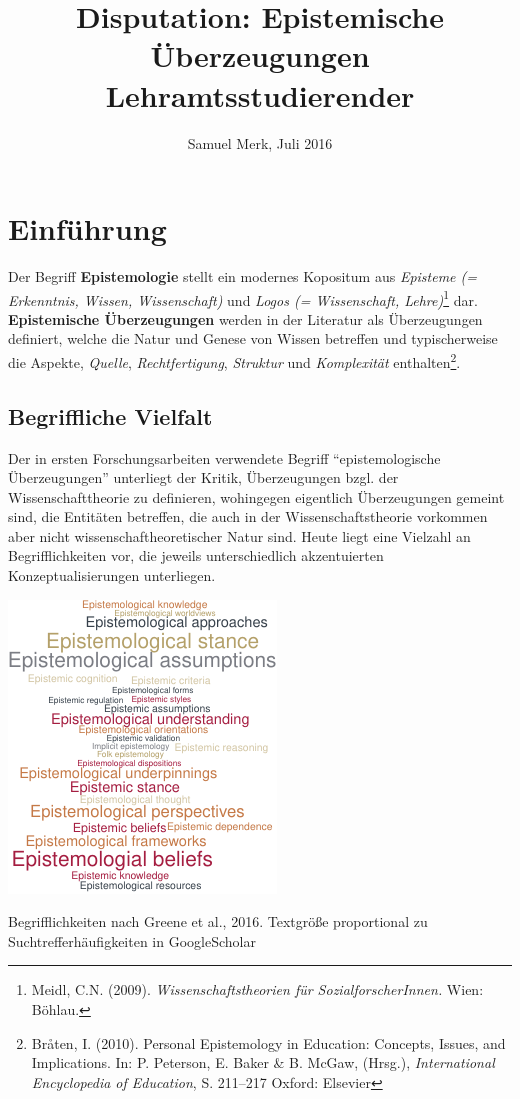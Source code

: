 \documentclass[]{tufte-handout}
\title{Disputation: Epistemische Überzeugungen \mbox{Lehramtsstudierender}}
\date{Samuel Merk, Juli 2016}
\begin{document}
\maketitle




\section{Einführung}\label{einfuhrung}

Der Begriff \textbf{Epistemologie} stellt ein modernes Kopositum aus
\emph{Episteme (= Erkenntnis, Wissen, Wissenschaft)} und \emph{Logos (=
Wissenschaft, Lehre)}\footnote{Meidl, C.N. (2009).
  \emph{Wissenschaftstheorien für SozialforscherInnen.} Wien: Böhlau.}
dar. \textbf{Epistemische Überzeugungen} werden in der Literatur als
Überzeugungen definiert, welche die Natur und Genese von Wissen
betreffen und typischerweise die Aspekte, \emph{Quelle},
\emph{Rechtfertigung}, \emph{Struktur} und \emph{Komplexität}
enthalten\footnote{Bråten, I. (2010). Personal Epistemology in
  Education: Concepts, Issues, and Implications. In: P. Peterson, E.
  Baker \& B. McGaw, (Hrsg.), \emph{International Encyclopedia of
  Education}, S. 211--217 Oxford: Elsevier}.

\subsection{Begriffliche Vielfalt}\label{begriffliche-vielfalt}

Der in ersten Forschungsarbeiten verwendete Begriff ``epistemologische
Überzeugungen'' unterliegt der Kritik, Überzeugungen bzgl. der
Wissenschafttheorie zu definieren, wohingegen eigentlich Überzeugungen
gemeint sind, die Entitäten betreffen, die auch in der
Wissenschaftstheorie vorkommen aber nicht wissenschaftheoretischer Natur
sind. Heute liegt eine Vielzahl an Begrifflichkeiten vor, die jeweils
unterschiedlich akzentuierten Konzeptualisierungen unterliegen.

\begin{marginfigure}
\includegraphics{Handout_files/figure-latex/fig-margin1-1} \caption[Begrifflichkeiten nach Greene et al]{Begrifflichkeiten nach Greene et al., 2016. Textgröße proportional zu Suchtrefferhäufigkeiten in GoogleScholar}\label{fig:fig-margin1}
\end{marginfigure}
\end{document}
